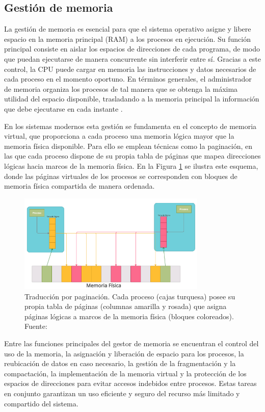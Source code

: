 \subsection{Gestión de memoria}

La gestión de memoria es esencial para que el sistema operativo asigne y libere espacio en la memoria principal (RAM) a los procesos en ejecución. Su función principal consiste en aislar los espacios de direcciones de cada programa, de modo que puedan ejecutarse de manera concurrente sin interferir entre sí. Gracias a este control, la CPU puede cargar en memoria las instrucciones y datos necesarios de cada proceso en el momento oportuno. En términos generales, el administrador de memoria organiza los procesos de tal manera que se obtenga la máxima utilidad del espacio disponible, trasladando a la memoria principal la información que debe ejecutarse en cada instante \citep{wikipedia1}.  

En los sistemas modernos esta gestión se fundamenta en el concepto de memoria virtual, que proporciona a cada proceso una memoria lógica mayor que la memoria física disponible. Para ello se emplean técnicas como la paginación, en las que cada proceso dispone de su propia tabla de páginas que mapea direcciones lógicas hacia marcos de la memoria física. En la Figura \ref{fig:memoria} se ilustra este esquema, donde las páginas virtuales de los procesos se corresponden con bloques de memoria física compartida de manera ordenada.  

\begin{figure}[H]
    \centering
    \includegraphics[width=0.8\textwidth]{figures/memoria.png}
    \caption{Traducción por paginación. Cada proceso (cajas turquesa) posee su propia tabla de páginas (columnas amarilla y rosada) que asigna páginas lógicas a marcos de la memoria física (bloques coloreados). Fuente: \citep{wikipedia2}}
    \label{fig:memoria}
\end{figure}

Entre las funciones principales del gestor de memoria se encuentran el control del uso de la memoria, la asignación y liberación de espacio para los procesos, la reubicación de datos en caso necesario, la gestión de la fragmentación y la compactación, la implementación de la memoria virtual y la protección de los espacios de direcciones para evitar accesos indebidos entre procesos. Estas tareas en conjunto garantizan un uso eficiente y seguro del recurso más limitado y compartido del sistema.  


